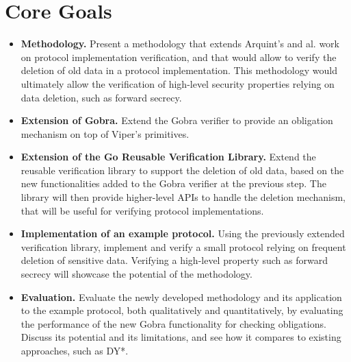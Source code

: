 \documentclass{article}
\begin{document}

\section{Core Goals}

\begin{itemize}
      \item \textbf{Methodology.} Present a methodology that extends Arquint's and al. work on protocol implementation verification, and that would allow to verify the deletion of old data in a protocol implementation. This methodology would ultimately allow the verification of high-level security properties relying on data deletion, such as forward secrecy.
      \item \textbf{Extension of Gobra.} Extend the Gobra verifier to provide an obligation mechanism on top of Viper's primitives.
      \item \textbf{Extension of the Go Reusable Verification Library.} Extend the reusable verification library to support the deletion of old data, based on the new functionalities added to the Gobra verifier at the previous step. The library will then provide higher-level APIs to handle the deletion mechanism, that will be useful for verifying protocol implementations.
      \item \textbf{Implementation of an example protocol.} Using the previously extended verification library, implement and verify a small protocol relying on frequent deletion of sensitive data. Verifying a high-level property such as forward secrecy will showcase the potential of the methodology.
      \item \textbf{Evaluation.} Evaluate the newly developed methodology and its application to the example protocol, both qualitatively and quantitatively, by evaluating the performance of the new Gobra functionality for checking obligations. Discuss its potential and its limitations, and see how it compares to existing approaches, such
      as DY*.

\end{itemize}
\end{document}
